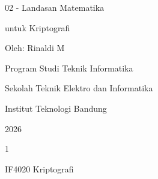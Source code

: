 \documentclass{article}
\begin{document}

02 - Landasan Matematika

untuk Kriptografi

Oleh: Rinaldi M

Program Studi Teknik Informatika

Sekolah Teknik Elektro dan Informatika

Institut Teknologi Bandung

2026

1

IF4020 Kriptografi
\end{document}
